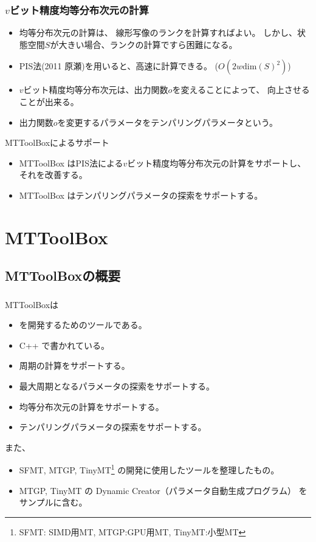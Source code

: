 \documentclass[cjk, dvips, xcolor=dvipsnames, hyperref={bookmarks=false}]{beamer}
\begin{document}
\begin{frame}[t]
  \frametitle{$v$ビット精度均等分布次元の計算}

  \begin{itemize}
  \item 均等分布次元の計算は、
  線形写像のランクを計算すればよい。
  しかし、状態空間$S$が大きい場合、ランクの計算ですら困難になる。
  \pause
  \item PIS法\cite{PIS}(2011 原瀬)を用いると、高速に計算できる。
    ($O(2w\mathrm{dim}(S)^2)$)
    \pause
  \item $v$ビット精度均等分布次元は、出力関数$o$を変えることによって、
    向上させることが出来る。
    \pause
  \item 出力関数$o$を変更するパラメータをテンパリングパラメータという。
  \end{itemize}

  \pause
  \begin{block}{MTToolBoxによるサポート}
    \begin{itemize}
    \item MTToolBox はPIS法による$v$ビット精度均等分布次元の計算をサポートし、
      それを改善する。
    \item MTToolBox はテンパリングパラメータの探索をサポートする。
    \end{itemize}
  \end{block}
\end{frame}

\section{MTToolBox}
\subsection{MTToolBoxの概要}
\begin{frame}[t]
  \frametitle{\insertsubsection}
  MTToolBoxは
  \begin{itemize}
  \item \FLPRNG を開発するためのツールである。
  \item C++ で書かれている。
  \item 周期の計算をサポートする。
  \item 最大周期となるパラメータの探索をサポートする。
  \item 均等分布次元の計算をサポートする。
  \item テンパリングパラメータの探索をサポートする。
  \end{itemize}

  \pause
  また、
  \begin{itemize}
  \item SFMT, MTGP, TinyMT\footnote{SFMT: SIMD用MT, MTGP:GPU用MT, TinyMT:小型MT}
    の開発に使用したツールを整理したもの。
  \item MTGP, TinyMT の Dynamic Creator（パラメータ自動生成プログラム）
    をサンプルに含む。
  \end{itemize}
\end{frame}
\end{document}
